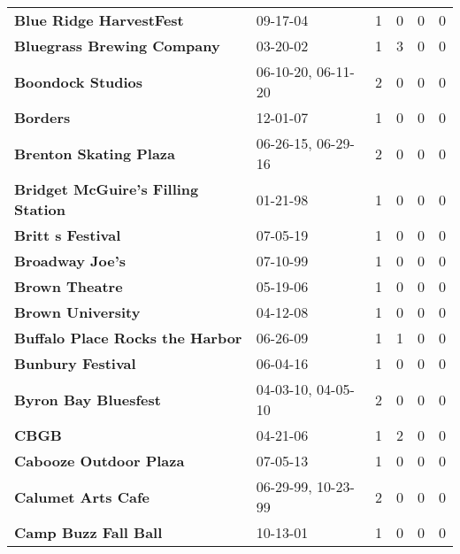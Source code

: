 \begin{supertabular}{p{0.4\textwidth}p{0.3\textwidth}p{0.05\textwidth}p{0.05\textwidth}p{0.05\textwidth}p{0.05\textwidth}}
                                      \textbf{Blue Ridge HarvestFest} &            09-17-04 &  1 &  0 &  0 &  0 \\
                                   \textbf{Bluegrass Brewing Company} &            03-20-02 &  1 &  3 &  0 &  0 \\
                                            \textbf{Boondock Studios} &  06-10-20, 06-11-20 &  2 &  0 &  0 &  0 \\
                                                     \textbf{Borders} &            12-01-07 &  1 &  0 &  0 &  0 \\
                                       \textbf{Brenton Skating Plaza} &  06-26-15, 06-29-16 &  2 &  0 &  0 &  0 \\
                           \textbf{Bridget McGuire's Filling Station} &            01-21-98 &  1 &  0 &  0 &  0 \\
                                            \textbf{Britt s Festival} &            07-05-19 &  1 &  0 &  0 &  0 \\
                                              \textbf{Broadway Joe's} &            07-10-99 &  1 &  0 &  0 &  0 \\
                                               \textbf{Brown Theatre} &            05-19-06 &  1 &  0 &  0 &  0 \\
                                            \textbf{Brown University} &            04-12-08 &  1 &  0 &  0 &  0 \\
                              \textbf{Buffalo Place Rocks the Harbor} &            06-26-09 &  1 &  1 &  0 &  0 \\
                                            \textbf{Bunbury Festival} &            06-04-16 &  1 &  0 &  0 &  0 \\
                                         \textbf{Byron Bay Bluesfest} &  04-03-10, 04-05-10 &  2 &  0 &  0 &  0 \\
                                                        \textbf{CBGB} &            04-21-06 &  1 &  2 &  0 &  0 \\
                                       \textbf{Cabooze Outdoor Plaza} &            07-05-13 &  1 &  0 &  0 &  0 \\
                                           \textbf{Calumet Arts Cafe} &  06-29-99, 10-23-99 &  2 &  0 &  0 &  0 \\
                                         \textbf{Camp Buzz Fall Ball} &            10-13-01 &  1 &  0 &  0 &  0 \\

\end{supertabular}
